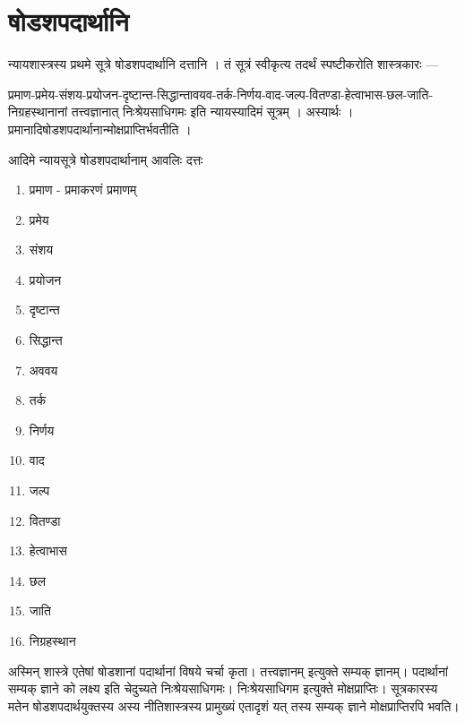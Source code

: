 \documentclass[12pt,a4paper]{report}
\begin{document}
\section{षोडशपदार्थानि}

न्यायशास्त्रस्य प्रथमे सूत्रे षोडशपदार्थानि दत्तानि । तं सूत्रं स्वीकृत्य तदर्थं स्पष्टीकरोति शास्त्रकारः ---

\begin{large}
\begin{center}
प्रमाण-प्रमेय-संशय-प्रयोजन-दृष्टान्त-सिद्धान्तावयव-तर्क-निर्णय-वाद-जल्प-वितण्डा-हेत्वाभास-छल-जाति-निग्रहस्थानानां तत्त्वज्ञानात् निःश्रेयसाधिगमः इति न्यायस्यादिमं सूत्रम् । अस्यार्थः । प्रमानादिषोडशपदार्थानान्मोक्षप्राप्तिर्भवतीति ।
\end{center}
\end{large}

आदिमे न्यायसूत्रे षोडशपदार्थानाम् आवलिः दत्तः

\begin{enumerate}
 \item प्रमाण - प्रमाकरणं प्रमाणम्
 \item प्रमेय
 \item संशय
 \item प्रयोजन
 \item दृष्टान्त
 \item सिद्धान्त
 \item अववय
 \item तर्क
 \item निर्णय
 \item वाद
 \item जल्प
 \item वितण्डा
 \item हेत्वाभास
 \item छल
 \item जाति
 \item निग्रहस्थान
\end{enumerate}

अस्मिन् शास्त्रे एतेषां षोडशानां‌ पदार्थानां‌ विषये चर्चा कृता। तत्त्वज्ञानम् इत्युक्ते सम्यक् ज्ञानम्। पदार्थानां सम्यक् ज्ञाने को लक्ष्य इति चेदुच्यते निःश्रेयसाधिगमः। निःश्रेयसाधिगम इत्युक्ते मोक्षप्राप्तिः। सूत्रकारस्य मतेन षोडशपदार्थयुक्तस्य अस्य नीतिशास्त्रस्य प्रामुख्यं एतादृशं यत् तस्य सम्यक् ज्ञाने मोक्षप्राप्तिरपि भवति। 
\end{document}
